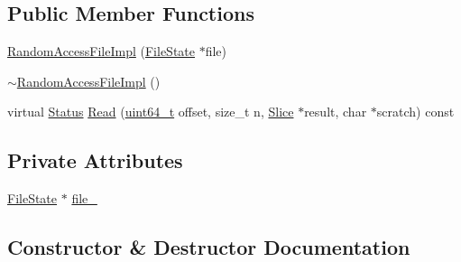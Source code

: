\subsection*{Public Member Functions}
\begin{DoxyCompactItemize}
\item 
\hyperlink{classleveldb_1_1anonymous__namespace_02memenv_8cc_03_1_1_random_access_file_impl_a1c51dbcffe4cdbd83ca7725b4ded34d1}{Random\+Access\+File\+Impl} (\hyperlink{classleveldb_1_1anonymous__namespace_02memenv_8cc_03_1_1_file_state}{File\+State} $\ast$file)
\item 
\hyperlink{classleveldb_1_1anonymous__namespace_02memenv_8cc_03_1_1_random_access_file_impl_a4560959ecf3b933da1eb2cb8c6b20881}{$\sim$\+Random\+Access\+File\+Impl} ()
\item 
virtual \hyperlink{classleveldb_1_1_status}{Status} \hyperlink{classleveldb_1_1anonymous__namespace_02memenv_8cc_03_1_1_random_access_file_impl_a4f5bc4f3ab0a530dd50ffceb1f09e0f1}{Read} (\hyperlink{stdint_8h_aaa5d1cd013383c889537491c3cfd9aad}{uint64\+\_\+t} offset, size\+\_\+t n, \hyperlink{classleveldb_1_1_slice}{Slice} $\ast$result, char $\ast$scratch) const 
\end{DoxyCompactItemize}
\subsection*{Private Attributes}
\begin{DoxyCompactItemize}
\item 
\hyperlink{classleveldb_1_1anonymous__namespace_02memenv_8cc_03_1_1_file_state}{File\+State} $\ast$ \hyperlink{classleveldb_1_1anonymous__namespace_02memenv_8cc_03_1_1_random_access_file_impl_ad736f8d0cc529b06299278fcc2e1e41b}{file\+\_\+}
\end{DoxyCompactItemize}


\subsection{Constructor \& Destructor Documentation}
\hypertarget{classleveldb_1_1anonymous__namespace_02memenv_8cc_03_1_1_random_access_file_impl_a1c51dbcffe4cdbd83ca7725b4ded34d1}{}
